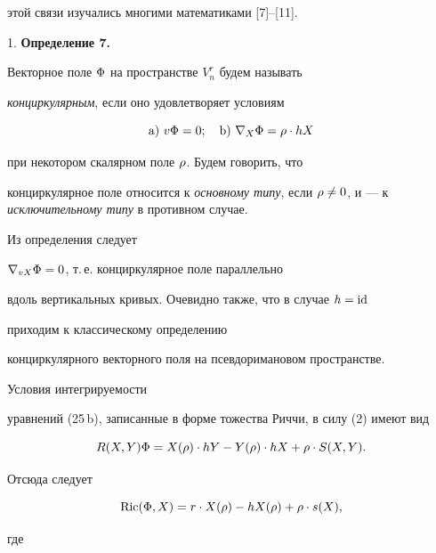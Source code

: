 этой связи изучались многими математиками [7]--[11].


\medskip





1. {\bf Определение 7.}


Векторное поле $\Phi$ на пространстве $V^r_n$ будем называть


{\it конциркулярным}, если оно удовлетворяет условиям


\begin{equation}


\mathrm a)\ v\F=0; \quad\mathrm b)\ \nb_{X}\F=\ro \cdot hX


\end{equation}


при некотором скалярном поле $\rho $. Будем говорить, что


конциркулярное поле относится к {\it основному типу}, если $\ro


\ne 0$, и --- к {\it исключительному типу} в противном случае.


\medskip





Из определения следует


$\nabla_{vX}\Phi=0$, т.\,е. конциркулярное поле параллельно


вдоль вертикальных кривых. Очевидно также, что в случае $h=\operatorname{id}$


приходим к классическому определению


конциркулярного векторного поля на псевдоримановом пространстве.





Условия интегрируемости


уравнений (25\,b), записанные в форме тожества Риччи, в силу (2) имеют вид


\begin{equation}


R(X,Y)\F=X(\ro)\cdot hY-Y(\ro)\cdot hX +\ro \cdot S(X,Y).


\end{equation}


Отсюда следует


\begin{equation}


\Ric(\F,X)=r\cdot X(\ro) -hX(\ro) +\ro\cdot s(X),


\end{equation}


где


